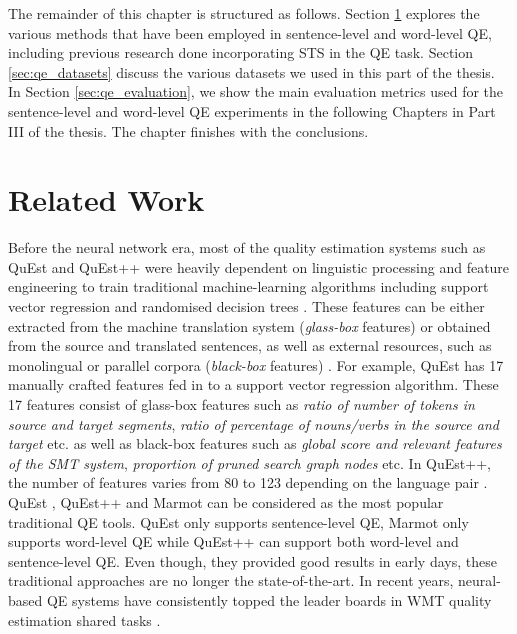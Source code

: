 The remainder of this chapter is structured as follows. Section \ref{sec:qe_related} explores the various methods that have been employed in sentence-level and word-level QE, including previous research done incorporating STS in the QE task. Section \ref{sec:qe_datasets} discuss the various datasets we used in this part of the thesis. In Section \ref{sec:qe_evaluation}, we show the main evaluation metrics used for the sentence-level and word-level QE experiments in the following Chapters in Part III of the thesis. The chapter finishes with the conclusions.



\section{Related Work}
\label{sec:qe_related}
Before the neural network era, most of the quality estimation systems such as QuEst \autocite{specia-etal-2013-quest} and QuEst++ \autocite{specia-etal-2015-multi} were heavily dependent on linguistic processing and feature engineering to train traditional machine-learning algorithms including support vector regression and randomised decision trees \autocite{specia-etal-2013-quest}. These features can be either extracted from the machine translation system (\textit{glass-box} features) or obtained from
the source and translated sentences, as well as external resources, such as monolingual or parallel corpora (\textit{black-box} features) \autocite{specia-etal-2009-estimating}. For example, QuEst \autocite{specia-etal-2013-quest} has 17 manually crafted features fed in to a support vector regression algorithm. These 17 features consist of glass-box features such as \textit{ratio of number of tokens in source and target segments}, \textit{ratio of percentage of nouns/verbs in the source and target} etc. as well as black-box features such as \textit{global score and relevant features of the SMT system}, \textit{proportion of pruned search graph nodes} etc. In QuEst++, the number of features varies from 80 to 123 depending on the language pair \autocite{specia-etal-2015-multi}. QuEst \autocite{specia-etal-2013-quest}, QuEst++ \autocite{specia-etal-2015-multi} and Marmot \autocite{logacheva-etal-2016-marmot} can be considered as the most popular traditional QE tools. QuEst \autocite{specia-etal-2013-quest} only supports sentence-level QE, Marmot \autocite{logacheva-etal-2016-marmot} only supports word-level QE while QuEst++ \autocite{specia-etal-2015-multi} can support both word-level and sentence-level QE. Even though, they provided good results in early days, these traditional approaches are no longer the state-of-the-art. In recent years, neural-based QE systems have consistently topped the leader boards in WMT quality estimation shared tasks  \autocite{kepler-etal-2019-openkiwi}.  


